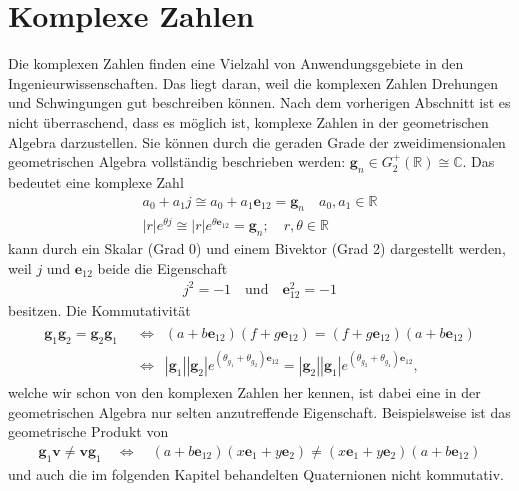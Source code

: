 %
%
%
\section{Komplexe Zahlen}

Die komplexen Zahlen finden eine Vielzahl von Anwendungsgebiete in den Ingenieurwissenschaften. Das liegt daran, weil die komplexen Zahlen Drehungen und Schwingungen gut beschreiben können. Nach dem vorherigen Abschnitt ist es nicht überraschend, dass es möglich ist, komplexe Zahlen in der geometrischen Algebra darzustellen. Sie können durch die geraden Grade der zweidimensionalen geometrischen Algebra vollständig beschrieben werden: $\mathbf{g}_n \in G_2^+(\mathbb{R}) \cong \mathbb{C}$. Das bedeutet eine komplexe Zahl 
\begin{align}
a_0 + a_1 j \cong a_0 + a_1 \mathbf{e}_{12} = \mathbf{g}_n\quad a_0, a_1 \in \mathbb{R}\\
|r|e^{\theta j} \cong |r|e^{\theta \mathbf{e}_{12}} = \mathbf{g}_n; \quad r, \theta \in \mathbb{R}
\end{align}
kann durch ein Skalar (Grad 0) und einem Bivektor (Grad 2) dargestellt werden, weil $j$ und $\mathbf{e}_{12}$ beide die Eigenschaft
\begin{align}
j^2 = -1\quad\text{und}\quad\mathbf{e}_{12}^2 = -1
\end{align}
besitzen. Die Kommutativität
\begin{align}
\begin{split}
\mathbf{g}_1\mathbf{g}_2 = \mathbf{g}_2\mathbf{g}_1 \enspace&\Leftrightarrow\enspace (a + b \mathbf{e}_{12})(f + g \mathbf{e}_{12}) = (f + g \mathbf{e}_{12})(a + b \mathbf{e}_{12})\\ &\Leftrightarrow\enspace |\mathbf{g}_1||\mathbf{g}_2|e^{(\theta_{g_1} + \theta_{g_2})\mathbf{e}_{12}} =  |\mathbf{g}_2||\mathbf{g}_1|e^{(\theta_{g_2} + \theta_{g_1})\mathbf{e}_{12}},
\end{split}
\end{align}
welche wir schon von den komplexen Zahlen her kennen, ist dabei eine in der geometrischen Algebra nur selten anzutreffende Eigenschaft. Beispielsweise ist das geometrische Produkt von
\begin{align}
\mathbf{g}_1\mathbf{v}\not= \mathbf{v}\mathbf{g}_1 \quad\Leftrightarrow\quad(a + b \mathbf{e}_{12})(x\mathbf{e}_1+y\mathbf{e}_2)\not= (x\mathbf{e}_1+y\mathbf{e}_2)(a + b \mathbf{e}_{12})
\end{align}
und auch die im folgenden Kapitel behandelten Quaternionen nicht kommutativ.

